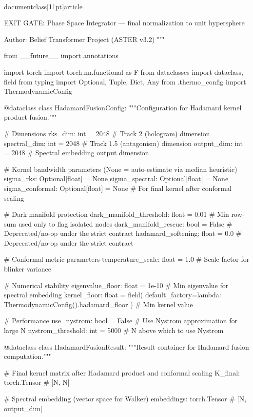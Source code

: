 \\documentclass[11pt]{article}
\begin{document}
\begin{CodeBlock}
EXIT GATE: Phase Space Integrator — final normalization to unit hypersphere

Author: Belief Transformer Project (ASTER v3.2)
"""

from __future__ import annotations

import torch
import torch.nn.functional as F
from dataclasses import dataclass, field
from typing import Optional, Tuple, Dict, Any
from .thermo_config import ThermodynamicConfig


@dataclass
class HadamardFusionConfig:
    """Configuration for Hadamard kernel product fusion."""

    # Dimensions
    rks_dim: int = 2048          # Track 2 (hologram) dimension
    spectral_dim: int = 2048     # Track 1.5 (antagonism) dimension
    output_dim: int = 2048       # Spectral embedding output dimension

    # Kernel bandwidth parameters (None = auto-estimate via median heuristic)
    sigma_rks: Optional[float] = None
    sigma_spectral: Optional[float] = None
    sigma_conformal: Optional[float] = None  # For final kernel after conformal scaling

    # Dark manifold protection
    dark_manifold_threshold: float = 0.01  # Min row-sum used only to flag isolated nodes
    dark_manifold_rescue: bool = False     # Deprecated/no-op under the strict contract
    hadamard_softening: float = 0.0        # Deprecated/no-op under the strict contract

    # Conformal metric parameters
    temperature_scale: float = 1.0         # Scale factor for blinker variance

    # Numerical stability
    eigenvalue_floor: float = 1e-10        # Min eigenvalue for spectral embedding
    kernel_floor: float = field(
        default_factory=lambda: ThermodynamicConfig().hadamard_floor
    )  # Min kernel value

    # Performance
    use_nystrom: bool = False              # Use Nystrom approximation for large N
    nystrom_threshold: int = 5000          # N above which to use Nystrom


@dataclass
class HadamardFusionResult:
    """Result container for Hadamard fusion computation."""

    # Final kernel matrix after Hadamard product and conformal scaling
    K_final: torch.Tensor                  # [N, N]

    # Spectral embedding (vector space for Walker)
    embeddings: torch.Tensor               # [N, output_dim]


\end{CodeBlock}
\end{document}
